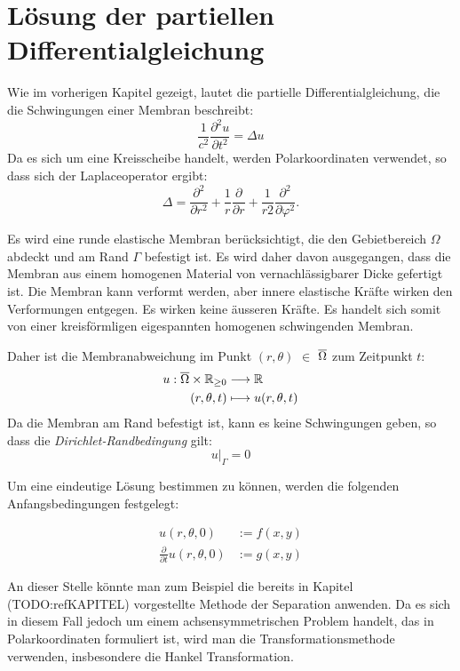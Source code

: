 %
%

\section{Lösung der partiellen Differentialgleichung
	\label{kreismembran:section:teil2}}

Wie im vorherigen Kapitel gezeigt, lautet die partielle Differentialgleichung, die die Schwingungen einer Membran beschreibt:
\begin{equation*}
	\frac{1}{c^2}\frac{\partial^2u}{\partial t^2} = \Delta u
\end{equation*}
Da es sich um eine Kreisscheibe handelt, werden Polarkoordinaten verwendet, so dass sich der Laplaceoperator ergibt:
\begin{equation*}
	\Delta
	=
	\frac{\partial^2}{\partial r^2}
	+
	\frac1r
	\frac{\partial}{\partial r}
	+
	\frac{1}{r 2}
	\frac{\partial^2}{\partial\varphi^2}.
	\label{buch:pde:kreis:laplace}
\end{equation*}

Es wird eine runde elastische Membran berücksichtigt, die den Gebietbereich $\Omega$ abdeckt und am Rand $\Gamma$ befestigt ist.
Es wird daher davon ausgegangen, dass die Membran aus einem homogenen Material von vernachlässigbarer Dicke gefertigt ist.
Die Membran kann verformt werden, aber innere elastische Kräfte wirken den Verformungen entgegen. Es wirken keine äusseren Kräfte. Es handelt sich somit von einer kreisförmligen eigespannten homogenen schwingenden Membran.

Daher ist die Membranabweichung im Punkt $(r,\theta)$ $\in$ $\overline{\rm \Omega}$ zum Zeitpunkt $t$:
\begin{align*}
	u: \overline{\rm \Omega} \times \mathbb{R}_{\geq 0} &\longrightarrow \mathbb{R}\\
	(r,\theta,t) &\longmapsto u(r,\theta,t)
\end{align*}
Da die Membran am Rand befestigt ist, kann es keine Schwingungen geben, so dass die \textit{Dirichlet-Randbedingung} gilt:
\begin{equation*}
	u\big|_{\Gamma} = 0
\end{equation*}


Um eine eindeutige Lösung bestimmen zu können, werden die folgenden Anfangsbedingungen festgelegt:

\begin{align*}
	u(r,\theta, 0) &:= f(x,y)\\
	\frac{\partial}{\partial t} u(r,\theta, 0) &:= g(x,y)
\end{align*}

An dieser Stelle könnte man zum Beispiel die bereits in Kapitel (TODO:refKAPITEL) vorgestellte Methode der Separation anwenden. Da es sich in diesem Fall jedoch um einem achsensymmetrischen Problem handelt, das in Polarkoordinaten formuliert ist, wird man die Transformationsmethode verwenden, insbesondere die Hankel Transformation.
